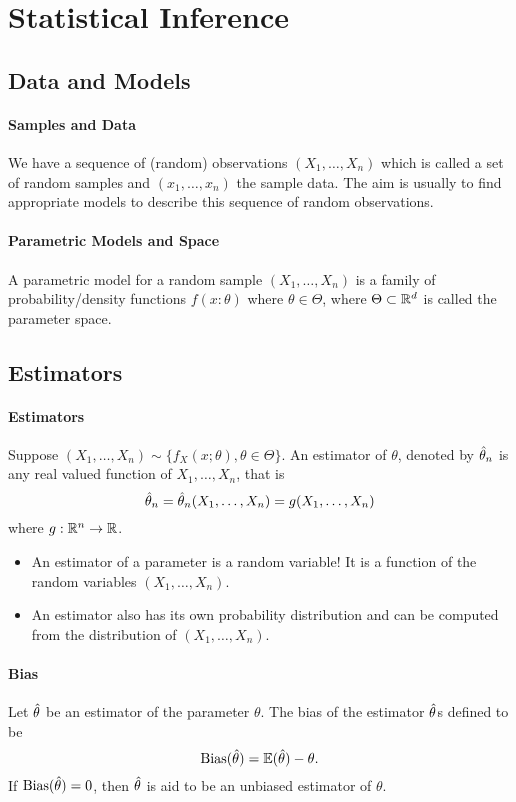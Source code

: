 \section{Statistical Inference}

\subsection{Data and Models}
\paragraph{Samples and Data}
We have a sequence of (random) observations \((X_1, \dots, X_n)\) which is called a set of random samples and \((x_1, \dots, x_n)\) the sample data. The aim is usually to find appropriate models to describe this sequence of random observations.

\paragraph{Parametric Models and Space}
A parametric model for a random sample \((X_1, \dots, X_n)\) is a family of probability/density functions \(f(x:\theta)\) where \(\theta \in \Theta\), where \(\Theta \subset \mathbb{R}^d\) is called the parameter space.

\subsection{Estimators}
\paragraph{Estimators}
Suppose \((X_1, \dots, X_n) \sim \{f_X(x;\theta), \theta \in \Theta\}\). An estimator of \(\theta\), denoted by \(\hat{\theta}_n\) is any real valued function of \(X_1, \dots, X_n\), that is
\[\hat{\theta}_n = \hat{\theta}_n(X_1, \dots, X_n) = g(X_1, \dots, X_n)\]
where \(g: \mathbb{R}^n \to \mathbb{R}\).
\begin{itemize}
    \item An estimator of a parameter is a random variable! It is a function of the random variables \((X_1, \dots, X_n)\).
    \item An estimator also has its own probability distribution and can be computed from the distribution of \((X_1, \dots, X_n)\).
\end{itemize}

\paragraph{Bias}
Let \(\hat{\theta}\) be an estimator of the parameter \(\theta\). The bias of the estimator \(\hat{\theta}\)s defined to be
\[\mathrm{Bias}(\hat{\theta}) = \mathbb{E}(\hat{\theta}) - \theta.\]
If \(\mathrm{Bias}(\hat{\theta}) = 0\), then \(\hat{\theta}\) is aid to be an unbiased estimator of \(\theta\).


